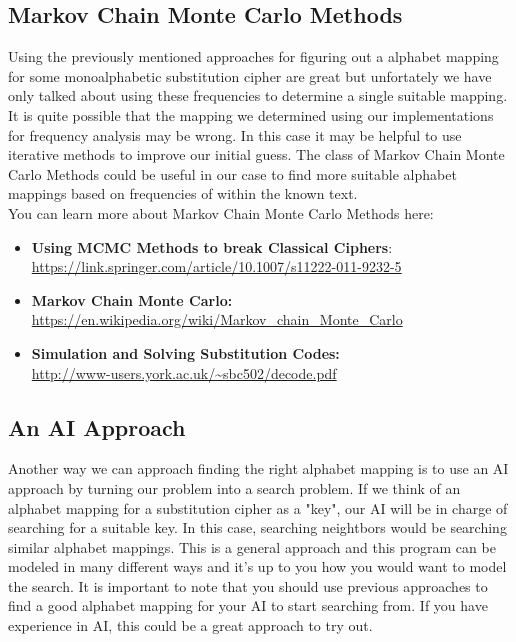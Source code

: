 \documentclass{article}
\begin{document}
\subsection{Markov Chain Monte Carlo Methods}
Using the previously mentioned approaches for figuring out a alphabet mapping for some monoalphabetic substitution cipher are great but unfortately we have only talked about using these frequencies to determine a single suitable mapping. It is quite possible that the mapping we determined using our implementations for frequency analysis may be wrong. In this case it may be helpful to use iterative methods to improve our initial guess. The class of Markov Chain Monte Carlo Methods could be useful in our case to find more suitable alphabet mappings based on frequencies of within the known text.\\

\noindent You can learn more about Markov Chain Monte Carlo Methods here:
\begin{itemize}
\item \textbf{Using MCMC Methods to break Classical Ciphers}:\\ \url{https://link.springer.com/article/10.1007/s11222-011-9232-5}
\item \textbf{Markov Chain Monte Carlo:}\\ \url{https://en.wikipedia.org/wiki/Markov_chain_Monte_Carlo}
\item \textbf{Simulation and Solving Substitution Codes:}\\ \url{http://www-users.york.ac.uk/~sbc502/decode.pdf}
\end{itemize}

\subsection{An AI Approach}
Another way we can approach finding the right alphabet mapping is to use an AI approach by turning our problem into a search problem. If we think of an alphabet mapping for a substitution cipher as a "key", our AI will be in charge of searching for a suitable key. In this case, searching neightbors would be searching similar alphabet mappings. This is a general approach and this program can be modeled in many different ways and it's up to you how you would want to model the search. It is important to note that you should use previous approaches to find a good alphabet mapping for your AI to start searching from. If you have experience in AI, this could be a great approach to try out.\\
\end{document}
